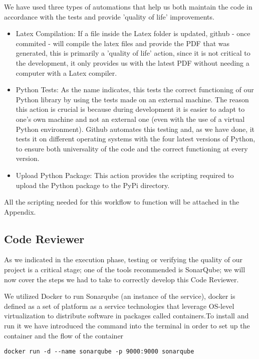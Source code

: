 We have used three types of automations that help us both maintain the code in accordance with the tests and provide 'quality of life' improvements.
\begin{itemize}
    \item Latex Compilation: If a file inside the Latex folder is updated, github - once commited - will compile the latex files and provide the PDF that was generated, this is primarily a 'quality of life' action, since it is not critical to the development, it only provides us with the latest PDF without needing a computer with a Latex compiler.
    \item Python Tests: As the name indicates, this tests the correct functioning of our Python library by using the tests made on an external machine. The reason this action is crucial is because during development it is easier to adapt to one's own machine and not an external one (even with the use of a virtual Python environment). Github automates this testing and, as we have done, it tests it on different operating systems with the four latest versions of Python, to ensure both universality of the code and the correct functioning at every version.
    \item Upload Python Package: This action provides the scripting required to upload the Python package to the PyPi directory.
\end{itemize}
All the scripting needed for this workflow to function will be attached in the Appendix.

\subsection{Code Reviewer}
As we indicated in the execution phase, testing or verifying the quality of our project is a critical stage; one of the tools recommended is SonarQube; we will now cover the steps we had to take to correctly develop this Code Reviewer.

We utilized Docker to run Sonarqube (an instance of the service), docker is defined as a set of platform as a service technologies that leverage OS-level virtualization to distribute software in packages called containers\cite{enwiki:1148220158}.To install and run it we have introduced the command into the terminal in order to set up the container and the flow of the container

\begin{lstlisting}
docker run -d --name sonarqube -p 9000:9000 sonarqube
\end{lstlisting}

